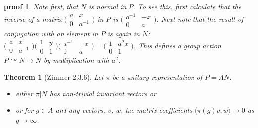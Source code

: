 \documentclass[
  12pt
]{article}
\newtheorem{thm}{Theorem}[section]
\theoremstyle{plain}
\newtheorem*{pf}{proof}
\newcommand{\mpi}{\ensuremath{\pi}\xspace}
\newcommand{\ipmatrix}[1]{%
\ensuremath{\big(\begin{smallmatrix} #1 \end{smallmatrix}\big)}\xspace}
\begin{document}
\begin{pf}
    Note first, that $N$ is normal in $P$. To see this, first calculate that the
    inverse of a matrix $\ipmatrix{ a & x \\ 0 & a^{-1} }$ in $P$ is $\ipmatrix{
    a^{-1} & -x \\ 0 & a }$. Next note that the result of conjugation with an
    element in $P$ is again in $N$: $\ipmatrix{ a & x \\ 0 & a^{-1} } \ipmatrix{1 &
    y \\ 0 & 1} \ipmatrix{ a^{-1} & -x \\ 0 & a } = \ipmatrix{1 & a^2x \\ 0 & 1}$.
    This defines a group action $P \curvearrowright N \rightarrow N$ by
    multiplication with $a^2$.
  \end{pf}

  \begin{thm}[Zimmer 2.3.6]
    \label{thm:2.3.6}
    Let \mpi be  a unitary representation of $P = AN$.
    \begin{itemize}
      \item either $\pi|N$ has non-trivial invariant vectors or
      \item or for $g \in A$ and any vectors, $v$, $w$, the matrix coefficients
        $\langle \pi(g)v, w \rangle \rightarrow 0$ as $g \rightarrow \infty$.
    \end{itemize}
  \end{thm}
\end{document}
